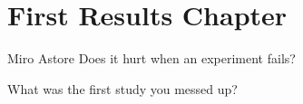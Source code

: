 \chapter{First Results Chapter}
\label{chap:results_1}
\begin{chapquote}{Miro Astore}
Does it hurt when an experiment fails?
\end{chapquote}

What was the first study you messed up?
